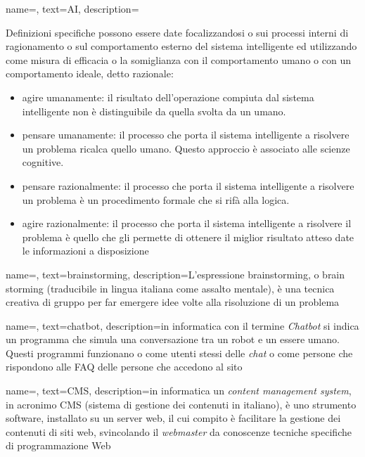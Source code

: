 {
    name=,
    text=AI,
    description={Definizioni specifiche possono essere date focalizzandosi o sui processi interni di ragionamento o sul comportamento esterno del sistema intelligente ed utilizzando come misura di efficacia o la somiglianza con il comportamento umano o con un comportamento ideale, detto razionale:
\begin{itemize}
	\item agire umanamente: il risultato dell’operazione compiuta dal sistema intelligente non è distinguibile da quella svolta da un umano.
	\item pensare umanamente: il processo che porta il sistema intelligente a risolvere un problema ricalca quello umano. Questo approccio è associato alle scienze cognitive.
	\item pensare razionalmente: il processo che porta il sistema intelligente a risolvere un problema è un procedimento formale che si rifà alla logica.
	\item agire razionalmente: il processo che porta il sistema intelligente a risolvere il problema è quello che gli permette di ottenere il miglior risultato atteso date le informazioni a disposizione
\end{itemize}}
}

{
    name=,
    text=brainstorming,
    description={L'espressione brainstorming, o brain storming (traducibile in lingua italiana come assalto mentale), è una tecnica creativa di gruppo per far emergere idee volte alla risoluzione di un problema}
}

{
    name=,
    text=chatbot,
    description={in informatica con il termine \emph{Chatbot} si indica un programma che simula una conversazione tra un robot e un essere umano. Questi programmi funzionano o come utenti stessi delle \emph{chat} o come persone che rispondono alle FAQ delle persone che accedono al sito}
}

{
    name=,
    text=CMS,
    description={in informatica un \emph{content management system}, in acronimo CMS (sistema di gestione dei contenuti in italiano), è uno strumento software, installato su un server web, il cui compito è facilitare la gestione dei contenuti di siti web, svincolando il \emph{webmaster} da conoscenze tecniche specifiche di programmazione Web}
}

